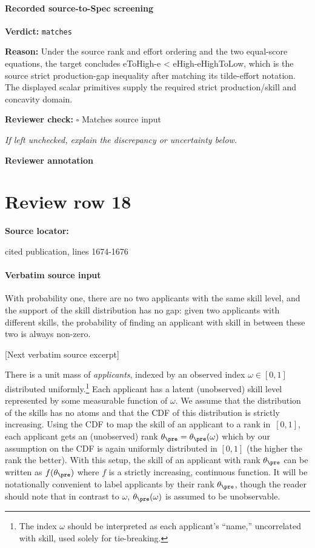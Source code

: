 \documentclass[10pt]{article}
\newcommand{\reviewerbox}{%
  \par\noindent\fbox{\parbox{0.96\linewidth}{\rule{0pt}{0.38in}}}\par
}
\newcommand{\reviewmatch}[1]{%
  \par\noindent\textbf{Reviewer check:} $\square$\; #1\par
  \noindent\emph{If left unchecked, explain the discrepancy or uncertainty below.}\par
}
\begin{document}
\paragraph{Recorded source-to-Spec screening}
\textbf{Verdict:} \texttt{matches}
\\
{\raggedright
\textbf{Reason:} Under the source rank and effort ordering and the two equal-\allowbreak{}score equations, the target concludes eToHigh-\allowbreak{}e < eHigh-\allowbreak{}eHighToLow, which is the source strict production-\allowbreak{}gap inequality after matching its tilde-\allowbreak{}effort notation.\allowbreak{} The displayed scalar primitives supply the required strict production/\allowbreak{}skill and concavity domain.\allowbreak{}
\par}
\reviewmatch{Matches source input}
\noindent\textbf{Reviewer annotation}\par
\reviewerbox
\clearpage
\hypertarget{source-claim-4fa39a045f045b81}{}
\section*{Review row 18}
\textbf{Source locator:} {\footnotesize\raggedright cited publication, lines 1674-\allowbreak{}1676\par}
\paragraph{Verbatim source input}
\begin{ReviewVerbatim}
\begin{remark}
	With probability one, there are no two applicants with the same skill level, and the support of the skill distribution has no gap: given two applicants with different skills, the probability of finding an applicant with skill in between these two is always non-zero.
\end{remark}

[Next verbatim source excerpt]

There is a unit mass of \textit{applicants}, indexed by an observed index $\omega \in [0,1]$ distributed uniformly.\footnote{The index $\omega$ should be interpreted as each applicant's ``name,'' uncorrelated with skill, used solely for tie-breaking.}  Each applicant has a latent (unobserved) skill level represented by some measurable function of $\omega$.
We assume that {the distribution of the skills} has no atoms and that the CDF of this distribution is strictly increasing.
Using the CDF to map the skill of an applicant to a rank in~$[0,1]$, each applicant gets an (unobserved) rank $\theta_\pre =\theta_\pre(\omega)$ which by our assumption on the CDF is again uniformly distributed in $[0, 1]$ (the higher the rank the better).  With this setup, the skill of an applicant with rank $\theta_\pre$ can be written as $f(\theta_\pre)$ where $f$ is a strictly increasing, continuous function.  {It will be notationally convenient to label applicants by their rank $\theta_\pre$, though the reader should note that in contrast to $\omega$, $\theta_\pre(\omega)$ is assumed to be unobservable.}
\end{ReviewVerbatim}
\end{document}
